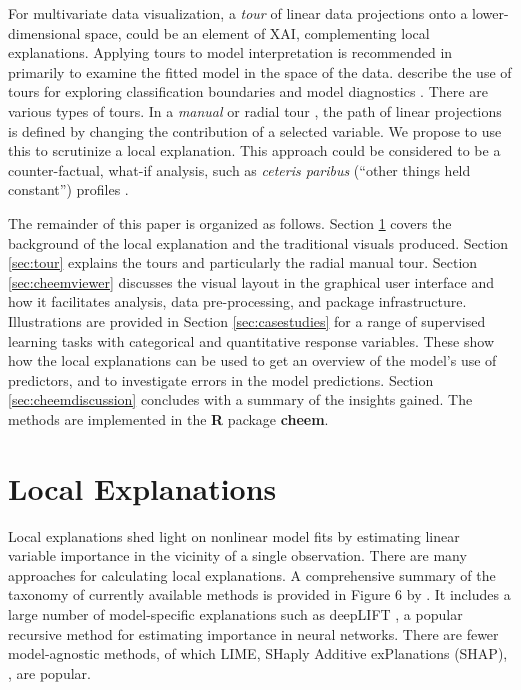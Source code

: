 \documentclass[
]{jss}
\begin{document}
For multivariate data visualization, a \emph{tour}
\citep{asimov_grand_1985, buja_grand_1986, lee_state_2021} of linear
data projections onto a lower-dimensional space, could be an element of
XAI, complementing local explanations. Applying tours to model
interpretation is recommended in \citet{wickham_visualizing_2015}
primarily to examine the fitted model in the space of the data.
\citet{cook_interactive_2007} describe the use of tours for exploring
classification boundaries and model diagnostics
\citep{Caragea2008, lee_pptree_2013, da_silva_projection_2021}. There
are various types of tours. In a \emph{manual} or radial tour
\citep{cook_manual_1997, spyrison_spinifex_2020}, the path of linear
projections is defined by changing the contribution of a selected
variable. We propose to use this to scrutinize a local explanation. This
approach could be considered to be a counter-factual, what-if analysis,
such as \emph{ceteris paribus} (``other things held constant'') profiles
\citep{biecek_ceterisparibus_2020}.

The remainder of this paper is organized as follows. Section
\ref{sec:explanations} covers the background of the local explanation
and the traditional visuals produced. Section \ref{sec:tour} explains
the tours and particularly the radial manual tour. Section
\ref{sec:cheemviewer} discusses the visual layout in the graphical user
interface and how it facilitates analysis, data pre-processing, and
package infrastructure. Illustrations are provided in Section
\ref{sec:casestudies} for a range of supervised learning tasks with
categorical and quantitative response variables. These show how the
local explanations can be used to get an overview of the model's use of
predictors, and to investigate errors in the model predictions. Section
\ref{sec:cheemdiscussion} concludes with a summary of the insights
gained. The methods are implemented in the \textbf{R} package
\textbf{cheem}.

\hypertarget{sec:explanations}{%
\section{Local Explanations}\label{sec:explanations}}

Local explanations shed light on nonlinear model fits by estimating
linear variable importance in the vicinity of a single observation.
There are many approaches for calculating local explanations. A
comprehensive summary of the taxonomy of currently available methods is
provided in Figure 6 by \citet{arrieta_explainable_2020}. It includes a
large number of model-specific explanations such as deepLIFT
\citep{shrikumar_not_2016, shrikumar_learning_2017}, a popular recursive
method for estimating importance in neural networks. There are fewer
model-agnostic methods, of which LIME, \citep{ribeiro_why_2016} SHaply
Additive exPlanations (SHAP), \citep{lundberg_unified_2017}, are
popular.
\end{document}
